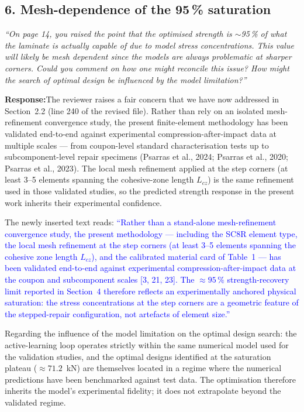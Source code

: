 \documentclass[11pt,a4paper]{article}
\newcommand{\new}[1]{\textcolor{blue}{#1}}
\newcommand{\rev}[1]{\par\noindent\textit{\small #1}\par\smallskip}
\newcommand{\resp}{\par\noindent\textbf{Response:}\space}
\begin{document}
\subsection*{6. Mesh-dependence of the 95\,\% saturation}
\rev{``On page 14, you raised the point that the optimised strength is $\sim$95\,\% of what the laminate is actually capable of due to model stress concentrations. This value will likely be mesh dependent since the models are always problematic at sharper corners. Could you comment on how one might reconcile this issue? How might the search of optimal design be influenced by the model limitation?''}
\resp The reviewer raises a fair concern that we have now addressed in Section~2.2 (line 240 of the revised file). Rather than rely on an isolated mesh-refinement convergence study, the present finite-element methodology has been validated end-to-end against experimental compression-after-impact data at multiple scales --- from coupon-level standard characterisation tests up to subcomponent-level repair specimens (Psarras et al., 2024; Psarras et al., 2020; Psarras et al., 2023). The local mesh refinement applied at the step corners (at least 3--5 elements spanning the cohesive-zone length $L_{cz}$) is the same refinement used in those validated studies, so the predicted strength response in the present work inherits their experimental confidence.

The newly inserted text reads: \new{``Rather than a stand-alone mesh-refinement convergence study, the present methodology --- including the SC8R element type, the local mesh refinement at the step corners (at least 3--5 elements spanning the cohesive zone length $L_{cz}$), and the calibrated material card of Table~1 --- has been validated end-to-end against experimental compression-after-impact data at the coupon and subcomponent scales [3, 21, 23]. The $\approx 95\,\%$ strength-recovery limit reported in Section~4 therefore reflects an experimentally anchored physical saturation: the stress concentrations at the step corners are a geometric feature of the stepped-repair configuration, not artefacts of element size.''}

Regarding the influence of the model limitation on the optimal design search: the active-learning loop operates strictly within the same numerical model used for the validation studies, and the optimal designs identified at the saturation plateau ($\approx 71.2$~kN) are themselves located in a regime where the numerical predictions have been benchmarked against test data. The optimisation therefore inherits the model's experimental fidelity; it does not extrapolate beyond the validated regime.
\end{document}
